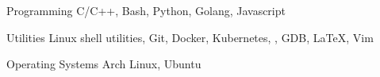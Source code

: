 
\vspace{-0.3cm}


\begin{cvskills}


  \cvskill
  {Programming}
  {C/C++, Bash, Python, Golang, Javascript}


  \cvskill
  {Utilities}
  {Linux shell utilities, Git, Docker, Kubernetes, , GDB, \LaTeX, Vim}


  \cvskill
  {Operating Systems}
  {Arch Linux, Ubuntu}


\end{cvskills}
